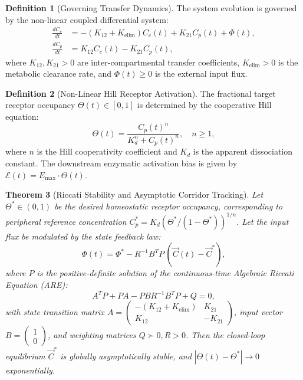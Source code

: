 \documentclass[11pt,a4paper]{article}
\newtheorem{theorem}{Theorem}[section]
\theoremstyle{definition}
\newtheorem{definition}[theorem]{Definition}
\begin{document}
\begin{definition}[Governing Transfer Dynamics]
The system evolution is governed by the non-linear coupled differential system:
\begin{align}
\frac{dC_c}{dt} &= -(K_{12} + K_{\text{elim}}) C_c(t) + K_{21} C_p(t) + \Phi(t), \\
\frac{dC_p}{dt} &= K_{12} C_c(t) - K_{21} C_p(t),
\end{align}
where $K_{12}, K_{21} > 0$ are inter-compartmental transfer coefficients, $K_{\text{elim}} > 0$ is the metabolic clearance rate, and $\Phi(t) \ge 0$ is the external input flux.
\end{definition}

\begin{definition}[Non-Linear Hill Receptor Activation]
The fractional target receptor occupancy $\Theta(t) \in [0, 1]$ is determined by the cooperative Hill equation:
\begin{equation}
\Theta(t) = \frac{C_p(t)^n}{K_d^n + C_p(t)^n}, \quad n \ge 1,
\end{equation}
where $n$ is the Hill cooperativity coefficient and $K_d$ is the apparent dissociation constant. The downstream enzymatic activation bias is given by $\mathcal{E}(t) = E_{\max} \cdot \Theta(t)$.
\end{definition}

\begin{theorem}[Riccati Stability and Asymptotic Corridor Tracking]
Let $\Theta^* \in (0, 1)$ be the desired homeostatic receptor occupancy, corresponding to peripheral reference concentration $C_p^* = K_d (\Theta^* / (1 - \Theta^*))^{1/n}$. Let the input flux be modulated by the state feedback law:
\begin{equation}
\Phi(t) = \Phi^* - R^{-1} B^T P \, (\vec{C}(t) - \vec{C}^*),
\end{equation}
where $P$ is the positive-definite solution of the continuous-time Algebraic Riccati Equation (ARE):
\begin{equation}
A^T P + P A - P B R^{-1} B^T P + Q = 0,
\end{equation}
with state transition matrix $A = \begin{pmatrix} -(K_{12} + K_{\text{elim}}) & K_{21} \\ K_{12} & -K_{21} \end{pmatrix}$, input vector $B = \begin{pmatrix} 1 \\ 0 \end{pmatrix}$, and weighting matrices $Q \succ 0, R > 0$. Then the closed-loop equilibrium $\vec{C}^*$ is globally asymptotically stable, and $|\Theta(t) - \Theta^*| \to 0$ exponentially.
\end{theorem}
\end{document}
